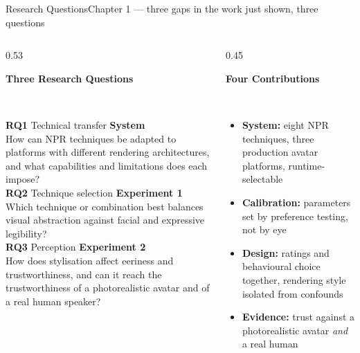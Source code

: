 \documentclass[aspectratio=169,10pt]{beamer}
\newcommand{\hl}[1]{{\color{knblue}\textbf{#1}}}
\newcommand{\panelhead}[1]{\noindent\colorbox{kncyan}{\parbox{0.96\textwidth}{\centering\vspace{1pt}\color{white}\scriptsize\bfseries #1\vspace{1pt}}}\\[0.25em]}
\newcommand{\panel}[1]{\noindent\colorbox{knlight}{\parbox{0.96\textwidth}{\vspace{2pt}\scriptsize
\begin{itemize}\setlength{\itemsep}{0.2em}\setlength{\leftmargini}{1.1em}#1\end{itemize}\vspace{2pt}}}}
\begin{document}
\begin{frame}{Research Questions}{Chapter 1 — three gaps in the work just shown, three questions}
  \vspace{0.4em}
  \begin{columns}[T]
    \begin{column}{0.53\textwidth}
      \panelhead{Three Research Questions}
      \noindent\colorbox{knlight}{\parbox{0.96\textwidth}{\vspace{3pt}\scriptsize
        \textbf{RQ1} Technical transfer \hfill \hl{System}\\[0.15em]
        How can NPR techniques be adapted to platforms with different rendering architectures, and what capabilities and limitations does each impose?\\[0.5em]
        \textbf{RQ2} Technique selection \hfill \hl{Experiment 1}\\[0.15em]
        Which technique or combination best balances visual abstraction against facial and expressive legibility?\\[0.5em]
        \textbf{RQ3} Perception \hfill \hl{Experiment 2}\\[0.15em]
        How does stylisation affect eeriness and trustworthiness, and can it reach the trustworthiness of a photorealistic avatar and of a real human speaker?\vspace{3pt}}}
    \end{column}
    \begin{column}{0.45\textwidth}
      \panelhead{Four Contributions}
      \panel{%
        \item \hl{System:} eight NPR techniques, three production avatar platforms, runtime-selectable
        \item \hl{Calibration:} parameters set by preference testing, not by eye
        \item \hl{Design:} ratings and behavioural choice together, rendering style isolated from confounds
        \item \hl{Evidence:} trust against a photorealistic avatar \emph{and} a real human}
    \end{column}
  \end{columns}
\end{frame}


\end{document}
